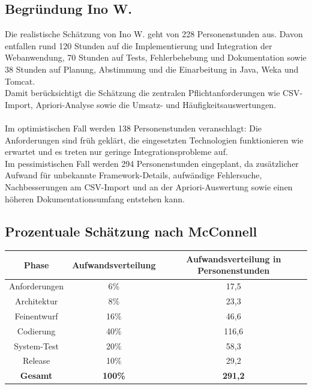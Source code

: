 \documentclass[a4paper,10pt]{article}
\begin{document}
        \subsection{Begründung Ino W.}
        Die realistische Schätzung von Ino W. geht von 228 Personenstunden aus.
        Davon entfallen rund 120 Stunden auf die Implementierung und Integration der Webanwendung,
        70 Stunden auf Tests, Fehlerbehebung und Dokumentation sowie 38 Stunden auf Planung,
        Abstimmung und die Einarbeitung in Java, Weka und Tomcat.\\
        Damit berücksichtigt die Schätzung die zentralen Pflichtanforderungen wie CSV-Import,
        Apriori-Analyse sowie die Umsatz- und
        Häufigkeitsauswertungen.
        \\\\
        Im optimistischen Fall werden 138 Personenstunden veranschlagt: Die Anforderungen sind früh
        geklärt, die eingesetzten Technologien funktionieren wie erwartet und es treten nur geringe
        Integrationsprobleme auf. \\
        Im pessimistischen Fall werden 294 Personenstunden eingeplant, da
        zusätzlicher Aufwand für unbekannte Framework-Details, aufwändige Fehlersuche, Nachbesserungen
        am CSV-Import und an der Apriori-Auswertung sowie einen höheren Dokumentationsumfang entstehen
        kann. \\


        \subsection*{Prozentuale Schätzung nach McConnell}
        \begin{tabular}{c|c|c}
            \hline
            Phase & Aufwandsverteilung & Aufwandsverteilung in Personenstunden \\
            \hline
            Anforderungen & 6\% & 17,5 \\
            Architektur & 8\% & 23,3 \\
            Feinentwurf & 16\% & 46,6 \\
            Codierung & 40\% & 116,6 \\
            System-Test & 20\% & 58,3 \\
            Release & 10\% & 29,2 \\
            \hline
            \textbf{Gesamt} & \textbf{100\%} & \textbf{291,2}
        \end{tabular}
\end{document}
